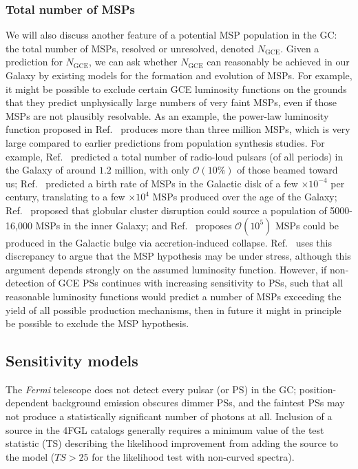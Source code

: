 \documentclass[letter,11pt]{article}
\begin{document}
\subsubsection{Total number of MSPs}
We will also discuss another feature of a potential MSP population in the GC: the total number of MSPs, resolved or unresolved, denoted $N_\text{GCE}$. Given a prediction for $N_\text{GCE}$, we can ask whether $N_\text{GCE}$ can reasonably be achieved in our Galaxy by existing models for the formation and evolution of MSPs. For example, it might be possible to exclude certain GCE luminosity functions on the grounds that they predict unphysically large numbers of very faint MSPs, even if those MSPs are not plausibly resolvable. As an example, the power-law luminosity function proposed in Ref.~\cite{Zhong:2019ycb} produces more than three million MSPs, which is very large compared to earlier predictions from population synthesis studies. For example, Ref.~\cite{Faucher-Giguere:2005dxp} predicted a total number of radio-loud pulsars (of all periods) in the Galaxy of around $1.2$ million, with only $\mathcal{O}(10\%)$ of those beamed toward us; Ref.~\cite{Story:2007xy} predicted a birth rate of MSPs in the Galactic disk of a few $\times 10^{-4}$ per century, translating to a few $\times 10^4$ MSPs produced over the age of the Galaxy; Ref.~\cite{Gonthier:2018ymi} proposed that globular cluster disruption could source a population of 5000-16,000 MSPs in the inner Galaxy; and Ref.~\cite{Gautam:2021wqn} proposes $\mathcal{O}(10^5)$ MSPs could be produced in the Galactic bulge via accretion-induced collapse. Ref.~\cite{Zhong:2019ycb} uses this discrepancy to argue that the MSP hypothesis may be under stress, although this argument depends strongly on the assumed luminosity function. However, if non-detection of GCE PSs continues with increasing sensitivity to PSs, such that all reasonable luminosity functions would predict a number of MSPs exceeding the yield of all possible production mechanisms, then in future it might in principle be possible to exclude the MSP hypothesis.

\subsection{Sensitivity models}
\label{sec:sensitivity}
The \textit{Fermi} telescope does not detect every pulsar (or PS) in the GC; position-dependent background emission obscures dimmer PSs, and the faintest PSs may not produce a statistically significant number of photons at all. Inclusion of a source in the 4FGL catalogs generally requires a minimum value of the test statistic (TS) describing the likelihood improvement from adding the source to the model ($TS > 25$ for the likelihood test with non-curved spectra).
\end{document}
